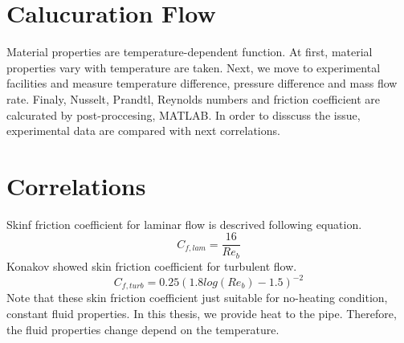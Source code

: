 \documentclass[conference]{IEEEtran}
\begin{document}
\newpage
\section{Calucuration Flow}
Material properties are temperature-dependent function.
At first, material properties vary with temperature are taken.
Next, we move to experimental facilities and measure temperature difference, pressure difference and mass flow rate.
Finaly, Nusselt, Prandtl, Reynolds numbers and friction coefficient are calcurated by post-proccesing, MATLAB. 
In order to disscuss the issue, experimental data are compared with next correlations.

\section{Correlations}
Skinf friction coefficient for laminar flow is descrived following equation.
\begin{equation}
C_{f,lam}=\frac{16}{Re_{b}}
\end{equation}
Konakov\cite{Konakov1954} showed skin friction coefficient for turbulent flow.
\begin{equation}
C_{f,turb}=0.25(1.8log(Re_{b})-1.5)^{-2}
\end{equation}
Note that these skin friction coefficient just suitable for no-heating condition, constant fluid properties.
In this thesis, we provide heat to the pipe.
Therefore, the fluid properties change depend on the temperature.
\end{document}
